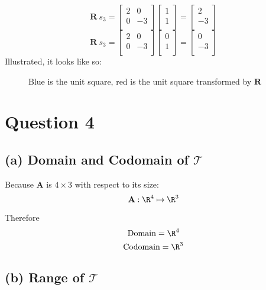 \documentclass{article}
\begin{document}
\[%
    \mathbf{R} \ s_3 = 
    \begin{bmatrix}
        2 & 0 \\
		0 & -3 \\		
    \end{bmatrix}
    \begin{bmatrix}
        1 \\ 1 \\
    \end{bmatrix}
    =
    \begin{bmatrix}
        2 \\ -3 \\ 
    \end{bmatrix}
\]%
\[%
    \mathbf{R} \ s_3 = 
    \begin{bmatrix}
        2 & 0 \\
		0 & -3 \\		
    \end{bmatrix}
    \begin{bmatrix}
        0 \\ 1 \\
    \end{bmatrix}
    =
    \begin{bmatrix}
        0 \\ -3 \\
    \end{bmatrix}
\]%
Illustrated, it looks like so:
\begin{figure}[!htbp]
    \centering
    \caption{Blue is the unit square, red is the unit square transformed by  $
    \mathbf{R} $}
\end{figure}


\section{Question 4} 
\subsection{(a) Domain and Codomain of $ \mathcal{T} $} 
Because $ \mathbf{A} $ is $ 4 \times 3 $ with respect to its size:
\[%
    \mathbf{A} : \R^{4} \mapsto \R^{3}
\]%

Therefore 
\[%
    \text{Domain} = \R^{4}
\]%
\[%
    \text{Codomain} = \R^{3}
\]%

\subsection{(b) Range of $ \mathcal{T} $} 
\end{document}
